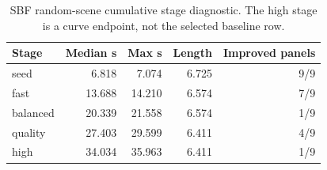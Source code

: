 \begin{table}[t]
\centering
\caption{SBF random-scene cumulative stage diagnostic. The high stage is a curve endpoint, not the selected baseline row.}
\label{tab:tro_random_sbf_stage_diagnostic}
\footnotesize
\begin{tabular}{lrrrr}
\toprule
Stage & Median s & Max s & Length & Improved panels \\
\midrule
seed & 6.818 & 7.074 & 6.725 & 9/9 \\
fast & 13.688 & 14.210 & 6.574 & 7/9 \\
balanced & 20.339 & 21.558 & 6.574 & 1/9 \\
quality & 27.403 & 29.599 & 6.411 & 4/9 \\
high & 34.034 & 35.963 & 6.411 & 1/9 \\
\bottomrule
\end{tabular}
\end{table}

